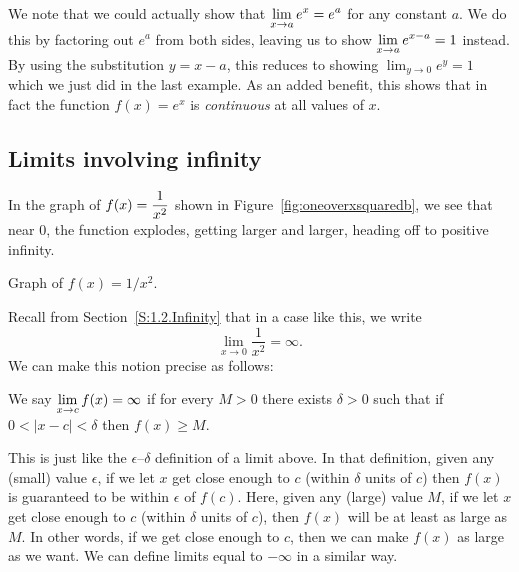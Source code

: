 

We note that we could actually show that $\displaystyle \lim_{x \to a} e^x = e^a$ for any constant $a$.  We do this by factoring out $e^a$ from both sides, leaving us to show $\displaystyle \lim_{x \to a} e^{x-a} = 1$ instead.  By using the substitution $y=x-a$, this reduces to showing $\lim_{y \to 0} e^y = 1 $ which we just did in the last example.  As an added benefit, this shows that in fact the function $f(x)=e^x$ is \textit{continuous} at all values of $x$.

\subsection*{Limits involving infinity}

In the graph of $\displaystyle f(x)= \frac{1}{x^2}$ shown in Figure~\ref{fig:oneoverxsquaredb}, we see that near $0$, the function explodes, getting larger and larger, heading off to positive infinity.

\begin{marginfigure}[1cm]
\caption{Graph of $f(x) = 1/x^2$. }\label{fig:oneoverxsquaredb}
\end{marginfigure}

Recall from Section~\ref{S:1.2.Infinity} that in a case like this, we write
\[ \lim_{x \to 0} \frac{1}{x^2}=\infty. \]
We can make this notion precise as follows:

{We say $\displaystyle \lim_{x\rightarrow c} f(x)=\infty$ if for every $M>0$ there exists $\delta>0$ such that if $0<|x-c|<\delta$ then $f(x)\geq M$. %
}

This is just like the $\epsilon$--$\delta$ definition of a limit above.  In that definition, given any (small) value $\epsilon$, if we let $x$ get close enough to $c$ (within $\delta$ units of $c$) then $f(x)$ is guaranteed to be within $\epsilon$ of $f(c)$.  Here, given any (large) value $M$, if we let $x$ get close enough to $c$ (within $\delta$ units of $c$), then $f(x)$ will be at least as large as $M$.  In other words, if we get close enough to $c$, then we can make $f(x)$ as large as we want.  We can define limits equal to $-\infty$ in a similar way.

